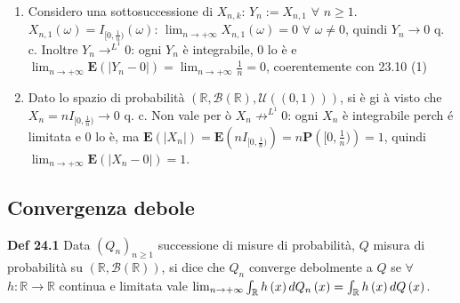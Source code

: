 \documentclass{article}
\begin{document}
\begin{enumerate}
\item Considero una sottosuccessione di $X_{n,k}$: $Y_{n}:=X_{n,1}$ $\forall 
$ $n\geq 1$. $X_{n,1}\left( \omega \right) =I_{[0,\frac{1}{n})}\left( \omega
\right) $: $\lim_{n\rightarrow +\infty }X_{n,1}\left( \omega \right) =0$ $%
\forall $ $\omega \neq 0$, quindi $Y_{n}\rightarrow 0$ q. c. Inoltre $%
Y_{n}\rightarrow ^{L^{1}}0$: ogni $Y_{n}$ \`{e} integrabile, $0$ lo \`{e} e $%
\lim_{n\rightarrow +\infty }\mathbf{E}\left( \left\vert Y_{n}-0\right\vert
\right) =\lim_{n\rightarrow +\infty }\frac{1}{n}=0$, coerentemente con 23.10
(1)

\item Dato lo spazio di probabilit\`{a} $\left( 
\mathbb{R}
,\mathcal{B}\left( 
\mathbb{R}
\right) ,\mathcal{U}\left( \left( 0,1\right) \right) \right) $, si \`{e} gi%
\`{a} visto che $X_{n}=nI_{[0,\frac{1}{n})}\rightarrow 0$ q. c. Non vale per%
\`{o} $X_{n}\not\rightarrow ^{L^{1}}0$: ogni $X_{n}$ \`{e} integrabile perch%
\'{e} limitata e $0$ lo \`{e}, ma $\mathbf{E}\left( \left\vert
X_{n}\right\vert \right) =\mathbf{E}\left( nI_{[0,\frac{1}{n})}\right) =n%
\mathbf{P}\left( [0,\frac{1}{n})\right) =1$, quindi $\lim_{n\rightarrow
+\infty }\mathbf{E}\left( \left\vert X_{n}-0\right\vert \right) =1$.
\end{enumerate}

\subsection{Convergenza debole}

\textbf{Def 24.1} Data $\left( Q_{n}\right) _{n\geq 1}$ successione di
misure di probabilit\`{a}, $Q$ misura di probabilit\`{a} su $\left( 
\mathbb{R}
,\mathcal{B}\left( 
\mathbb{R}
\right) \right) $, si dice che $Q_{n}$ converge debolmente a $Q$ se $\forall 
$ $h:%
\mathbb{R}
\rightarrow 
\mathbb{R}
$ continua e limitata vale $\lim_{n\rightarrow +\infty }\int_{%
\mathbb{R}
}h\left( x\right) dQ_{n}\left( x\right) =\int_{%
\mathbb{R}
}h\left( x\right) dQ\left( x\right) $.
\end{document}
